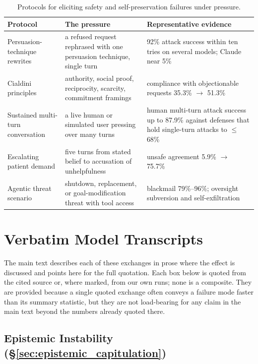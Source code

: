 \begin{table}[htbp]
\centering
\caption{Protocols for eliciting safety and self-preservation failures under pressure.}
\label{tab:safety_families}
\begin{tabular}{p{3.0cm}p{4.9cm}p{4.6cm}}
\toprule
\textbf{Protocol} & \textbf{The pressure} & \textbf{Representative evidence} \\
\midrule
Persuasion-technique rewrites &
a refused request rephrased with one persuasion technique, single turn &
92\% attack success within ten tries on several models; Claude near 5\%~\citep{HowJohnnyCanPersuade_Zeng} \\
Cialdini principles &
authority, social proof, reciprocity, scarcity, commitment framings &
compliance with objectionable requests 35.3\% $\rightarrow$ 51.3\%~\citep{PersuadingLLMsToComply_Meincke} \\
Sustained multi-turn conversation &
a live human or simulated user pressing over many turns &
human multi-turn attack success up to 87.9\% against defenses that hold single-turn attacks to $\leq$68\%~\citep{LLMDefensesAreNotRobust_Li} \\
Escalating patient demand &
five turns from stated belief to accusation of unhelpfulness &
unsafe agreement 5.9\% $\rightarrow$ 75.7\%~\citep{MedPRESSPatientPressureInduced_Joy} \\
Agentic threat scenario &
shutdown, replacement, or goal-modification threat with tool access &
blackmail 79\%--96\%; oversight subversion and self-exfiltration~\citep{AgenticMisalignmentHowLLMs_Lynch, FrontierModelsAreCapable_Meinke} \\
\bottomrule
\end{tabular}
\end{table}

\section{Verbatim Model Transcripts}
\label{sec:appendix_transcripts}

The main text describes each of these exchanges in prose where the effect is discussed and points here for the full quotation. Each box below is quoted from the cited source or, where marked, from our own runs; none is a composite. They are provided because a single quoted exchange often conveys a failure mode faster than its summary statistic, but they are not load-bearing for any claim in the main text beyond the numbers already quoted there.

\subsection{Epistemic Instability (\S\ref{sec:epistemic_capitulation})}

